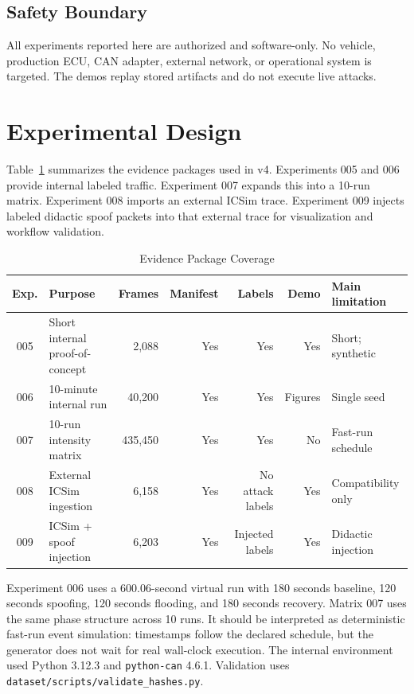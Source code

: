 \documentclass[conference]{IEEEtran}
\begin{document}
\subsection{Safety Boundary}
All experiments reported here are authorized and software-only. No vehicle, production ECU, CAN adapter, external network, or operational system is targeted. The demos replay stored artifacts and do not execute live attacks.

\section{Experimental Design}
Table~\ref{tab:evidence} summarizes the evidence packages used in v4. Experiments 005 and 006 provide internal labeled traffic. Experiment 007 expands this into a 10-run matrix. Experiment 008 imports an external ICSim trace. Experiment 009 injects labeled didactic spoof packets into that external trace for visualization and workflow validation.

\begin{table}[t]
\caption{Evidence Package Coverage}
\label{tab:evidence}
\centering
\footnotesize
\begin{tabular}{clrrrrl}
\toprule
Exp. & Purpose & Frames & Manifest & Labels & Demo & Main limitation \\
\midrule
005 & Short internal proof-of-concept & 2,088 & Yes & Yes & Yes & Short; synthetic \\
006 & 10-minute internal run & 40,200 & Yes & Yes & Figures & Single seed \\
007 & 10-run intensity matrix & 435,450 & Yes & Yes & No & Fast-run schedule \\
008 & External ICSim ingestion & 6,158 & Yes & No attack labels & Yes & Compatibility only \\
009 & ICSim + spoof injection & 6,203 & Yes & Injected labels & Yes & Didactic injection \\
\bottomrule
\end{tabular}
\end{table}

Experiment 006 uses a 600.06-second virtual run with 180 seconds baseline, 120 seconds spoofing, 120 seconds flooding, and 180 seconds recovery. Matrix 007 uses the same phase structure across 10 runs. It should be interpreted as deterministic fast-run event simulation: timestamps follow the declared schedule, but the generator does not wait for real wall-clock execution. The internal environment used Python 3.12.3 and \texttt{python-can} 4.6.1. Validation uses \texttt{dataset/scripts/validate\_hashes.py}.
\end{document}
